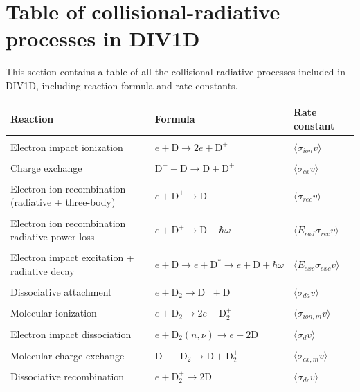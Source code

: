\documentclass[amsmath,amssymb,a4]{revtex4-2}
\begin{document}
\newpage
\section{Table of collisional-radiative processes in DIV1D}
\label{sec: Appendix reaction rates table}
This section contains a table of all the collisional-radiative processes included in DIV1D, including reaction formula and rate constants. 

\begin{longtable}[c]{|l|l|l|}
\hline
Reaction             & Formula & Rate constant  \\
\hline
 & &\\
Electron impact ionization  & $e+\mathrm{D}\rightarrow2e+\mathrm{D}^+$ & $\langle \sigma_{ion} v\rangle $\\
 & &\\
Charge exchange  & $\mathrm{D}^++\mathrm{D}\rightarrow\mathrm{D}+\mathrm{D}^+$ & $\langle \sigma_{cx} v\rangle $ \\
 & & \\
Electron ion recombination (radiative + three-body)  & $e+\mathrm{D}^+\rightarrow \mathrm{D}$ & $\langle \sigma_{rec} v\rangle $ \\
 & &\\
Electron ion recombination radiative power loss & $e+\mathrm{D}^+\rightarrow \mathrm{D} + \hbar\omega$ & $\langle E_{rad} \sigma_{rec} v\rangle $ \\
 & &\\
Electron impact excitation + radiative decay & $e+\mathrm{D}\rightarrow e + \mathrm{D}^* \rightarrow e+\mathrm{D}+ \hbar\omega$ & $\langle E_{exc} \sigma_{exc} v\rangle $\\
 & &\\
Dissociative attachment & $e+\text{D}_2\rightarrow \text{D}^-+\text{D}$ & $\langle \sigma_{da} v\rangle $   \\
 & &\\
Molecular ionization & $e+\text{D}_2\rightarrow 2e+\text{D}_2^+$ & $\langle \sigma_{ion, m} v\rangle $\\
 & &\\
Electron impact dissociation & $e+\text{D}_2(n,\nu)\rightarrow e+2\text{D}$ & $\langle \sigma_{d} v\rangle $\\
 & &\\
Molecular charge exchange & $\text{D}^++\text{D}_2\rightarrow \text{D} + \text{D}_2^+$ & $\langle \sigma_{cx,m} v\rangle $\\
 & &\\
Dissociative recombination & $e+\text{D}_2^+\rightarrow 2\text{D}$ & $\langle \sigma_{dr} v\rangle $  \\

\end{longtable}
\end{document}

